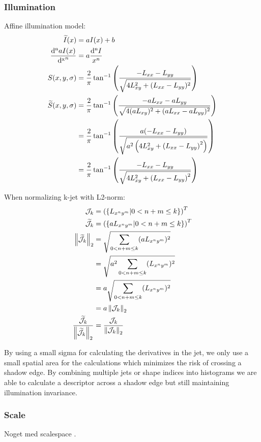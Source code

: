\documentclass[thesis.tex]{subfiles}
\begin{document}
\subsubsection{Illumination}
Affine illumination model:
\begin{align}
  \widetilde{I}(x) &= a I(x)  + b \\
  \frac{\mathop{}\!\mathrm{d^n} a I(x)}{\mathop{}\!\mathrm{d^x}^n} &= a \frac{\mathop{}\!\mathrm{d^n}I}{ x^n} \\
  S(x,y,\sigma) &= \frac{2}{\pi} \tan^{-1} \left( \frac{-L_{xx} - L_{yy}}{\sqrt{4L_{xy}^2 + (L_{xx} - L_{yy})^2}} \right) \\
  \widetilde{S}(x,y,\sigma) &= \frac{2}{\pi} \tan^{-1} \left( \frac{-a L_{xx} - a L_{yy}}{\sqrt{4(aL_{xy})^2 + (aL_{xx} - aL_{yy})^2}} \right) \\
  &= \frac{2}{\pi} \tan^{-1} \left( \frac{a (-L_{xx} - L_{yy})}{\sqrt{a^2 \left(4L_{xy}^2 + \left(L_{xx} - L_{yy} \right)^2 \right)}} \right) \\
  &= \frac{2}{\pi} \tan^{-1} \left( \frac{-L_{xx} - L_{yy}}{\sqrt{4L_{xy}^2 + \left(L_{xx} - L_{yy} \right)^2}} \right) \\
\end{align}


When normalizing k-jet with L2-norm:
\begin{align}
  \mathcal{J}_k &= \left( \left \lbrace L_{x^n y^m} | 0 < n+m \leq k \right \rbrace \right)^T \\
  \widetilde{\mathcal{J}}_k &=\left( \left \lbrace a L_{x^n y^m} | 0 < n+m \leq k \right \rbrace \right)^T \\
  \left \| \widetilde{\mathcal{J}}_k \right \|_2 &= \sqrt{\sum_{0 < n+m \leq k} (a L_{x^n y^m})^2} \\
      &= \sqrt{a^2\sum_{0 < n+m \leq k} (L_{x^n y^m})^2} \\
      &= a\sqrt{\sum_{0 < n+m \leq k} (L_{x^n y^m})^2} \\
      &= a \left \| \mathcal{J}_k \right \|_2 \\
  \frac{\widetilde{\mathcal{J}}_k}{\left \| \widetilde{\mathcal{J}}_k \right \|_2} &=
      \frac{\mathcal{J}_k}{\left \| \mathcal{J}_k \right \|_2}
\end{align}

By using a small sigma for calculating the derivatives in the jet, we only use a small spatial area for the calculations which minimizes the risk of crossing a shadow edge. By combining multiple jets or shape indices into histograms we are able to calculate a descriptor across a shadow edge but still maintaining illumination invariance.

\subsubsection{Scale}
Noget med scalespace \cite{griffin1997scale}.
\end{document}
